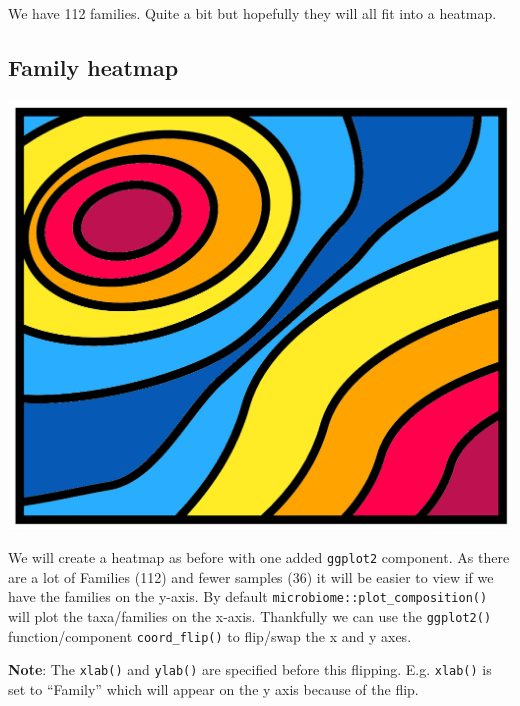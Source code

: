 \documentclass[
]{book}
\begin{document}
We have 112 families. Quite a bit but hopefully they will all fit into a heatmap.

\hypertarget{family-heatmap}{%
\subsection{Family heatmap}\label{family-heatmap}}

\includegraphics{figures/heat_topology.png}

We will create a heatmap as before with one added \texttt{ggplot2} component.
As there are a lot of Families (112) and fewer samples (36) it will be easier to view if we have the families on the y-axis.
By default \texttt{microbiome::plot\_composition()} will plot the taxa/families on the x-axis.
Thankfully we can use the \texttt{ggplot2()} function/component \texttt{coord\_flip()} to flip/swap the x and y axes.

\textbf{Note}: The \texttt{xlab()} and \texttt{ylab()} are specified before this flipping.
E.g. \texttt{xlab()} is set to ``Family'' which will appear on the y axis because of the flip.
\end{document}
